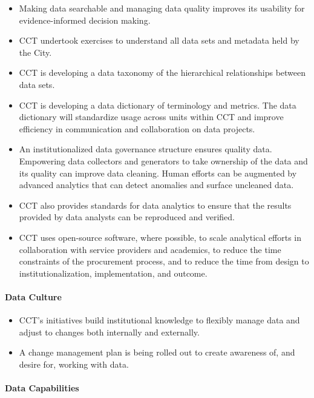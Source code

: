 \documentclass[
]{WileySix}
\providecommand{\tightlist}{%
  \setlength{\itemsep}{0pt}\setlength{\parskip}{0pt}}
\begin{document}
\begin{itemize}
\tightlist
\item
  Making data searchable and managing data quality improves its usability for evidence-informed decision making.
\item
  CCT undertook exercises to understand all data sets and metadata held by the City.
\item
  CCT is developing a data taxonomy of the hierarchical relationships between data sets.
\item
  CCT is developing a data dictionary of terminology and metrics. The data dictionary will standardize usage across units within CCT and improve efficiency in communication and collaboration on data projects.
\item
  An institutionalized data governance structure ensures quality data. Empowering data collectors and generators to take ownership of the data and its quality can improve data cleaning. Human efforts can be augmented by advanced analytics that can detect anomalies and surface uncleaned data.
\item
  CCT also provides standards for data analytics to ensure that the results provided by data analysts can be reproduced and verified.
\item
  CCT uses open-source software, where possible, to scale analytical efforts in collaboration with service providers and academics, to reduce the time constraints of the procurement process, and to reduce the time from design to institutionalization, implementation, and outcome.
\end{itemize}

\hypertarget{data-culture}{%
\paragraph{Data Culture}\label{data-culture}}

\begin{itemize}
\tightlist
\item
  CCT's initiatives build institutional knowledge to flexibly manage data and adjust to changes both internally and externally.
\item
  A change management plan is being rolled out to create awareness of, and desire for, working with data.
\end{itemize}

\hypertarget{data-capabilities}{%
\paragraph{Data Capabilities}\label{data-capabilities}}
\end{document}
